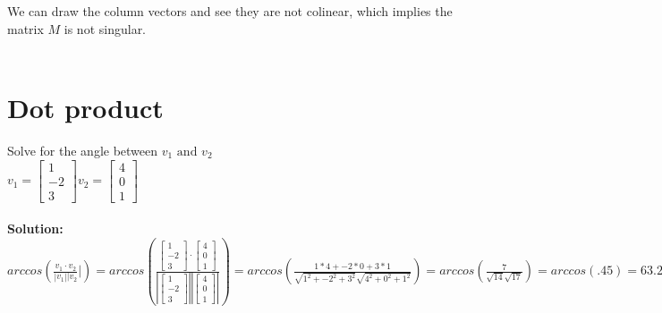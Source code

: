 \documentclass{article}
\begin{document}
We can draw the column vectors and see they are not colinear, which implies the matrix $M$ is not singular.\\\\

\section{Dot product}
Solve for the angle between $v_1 \text{ and } v_2$\\
$v_1=\begin{bmatrix}
1  \\
-2   \\
3
\end{bmatrix}
v_2=\begin{bmatrix}
4  \\
0   \\
1
\end{bmatrix}$\\\\
\textbf{Solution: }
$ arccos(\frac{v_1 \cdot v_2}{|v_1| |v_2}|)=arccos(\frac{\begin{bmatrix}
1\\
-2\\
3
\end{bmatrix} \cdot \begin{bmatrix}
4\\
0\\
1
\end{bmatrix}}{|\begin{bmatrix}
1\\
-2\\
3
\end{bmatrix}| |\begin{bmatrix}
4\\
0\\
1
\end{bmatrix}|})=arccos(\frac{1*4+-2*0+3*1}{\sqrt{1^2+-2^2+3^2}\sqrt{4^2+0^2+1^2}})=arccos(\frac{7}{\sqrt{14}\sqrt{17}})=arccos(.45)=63.26^\circ$
\end{document}
